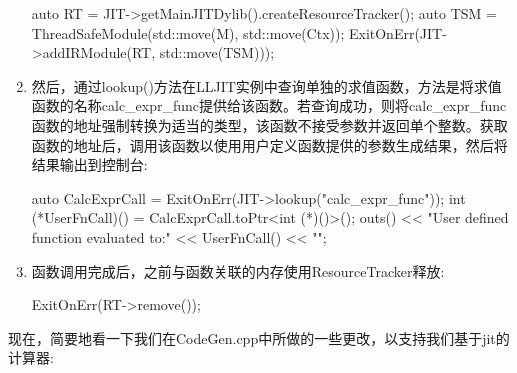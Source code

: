 \begin{enumerate}
\begin{cpp}
        auto RT = JIT->getMainJITDylib().createResourceTracker();
        auto TSM = ThreadSafeModule(std::move(M), std::move(Ctx));
        ExitOnErr(JIT->addIRModule(RT, std::move(TSM)));
\end{cpp}

\item
然后，通过lookup()方法在LLJIT实例中查询单独的求值函数，方法是将求值函数的名称calc\_expr\_func提供给该函数。若查询成功，则将calc\_expr\_func函数的地址强制转换为适当的类型，该函数不接受参数并返回单个整数。获取函数的地址后，调用该函数以使用用户定义函数提供的参数生成结果，然后将结果输出到控制台:

\begin{cpp}
        auto CalcExprCall = ExitOnErr(JIT->lookup("calc_expr_func"));
        int (*UserFnCall)() = CalcExprCall.toPtr<int (*)()>();
        outs() << "User defined function evaluated to:" << UserFnCall() << "\n";
\end{cpp}

\item
函数调用完成后，之前与函数关联的内存使用ResourceTracker释放:

\begin{cpp}
ExitOnErr(RT->remove());
\end{cpp}
\end{enumerate}



现在，简要地看一下我们在CodeGen.cpp中所做的一些更改，以支持我们基于jit的计算器:

